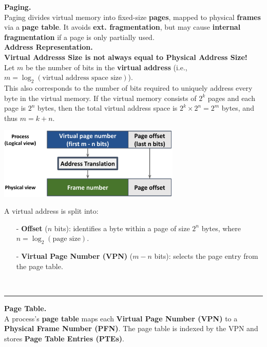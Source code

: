 \documentclass[8pt]{extarticle}
\begin{document}
\begin{minipage}[htp]{0.48\textwidth}
\vspace*{-10px}
\begin{minipage}[htp]{1\textwidth}
\noindent\textbf{Paging.} \\
Paging divides virtual memory into fixed-size \textbf{pages}, mapped to physical \textbf{frames} via a \textbf{page table}. It avoids \textbf{ext. fragmentation}, but may cause \textbf{internal fragmentation} if a page is only partially used.\\

\noindent\textbf{Address Representation.} \\
\textbf{Virtual Addresss Size is not always equal to Physical Address Size!}\\ 
Let $m$ be the number of bits in the \textbf{virtual address} (i.e., $m = \log_2(\text{virtual address space size})$). \\
This also corresponds to the number of bits required to uniquely address every byte in the virtual memory. If the virtual memory consists of $2^k$ pages and each page is $2^n$ bytes, then the total virtual address space is $2^k \times 2^n = 2^m$ bytes, and thus $m = k + n$.
\begin{center}
    \includegraphics[width=0.65\textwidth]{images/paging.png}
\end{center}
A virtual address is split into:
\begin{itemize}[noitemsep,topsep=0pt]
    \item[-] \textbf{Offset} ($n$ bits): identifies a byte within a page of size $2^n$ bytes, where $n = \log_2(\text{page size})$.
    \item[-] \textbf{Virtual Page Number (VPN)} ($m - n$ bits): selects the page entry from the page table.
\end{itemize}
\end{minipage}\\[2px]
\hrule
\vspace{3px}
\begin{minipage}[htp]{1\textwidth}
    \noindent\textbf{Page Table.} \\
    A process's \textbf{page table} maps each \textbf{Virtual Page Number (VPN)} to a \textbf{Physical Frame Number (PFN)}. The page table is indexed by the VPN and stores \textbf{Page Table Entries (PTEs)}.\\[5px]

\end{minipage}
\end{minipage}
\end{document}
